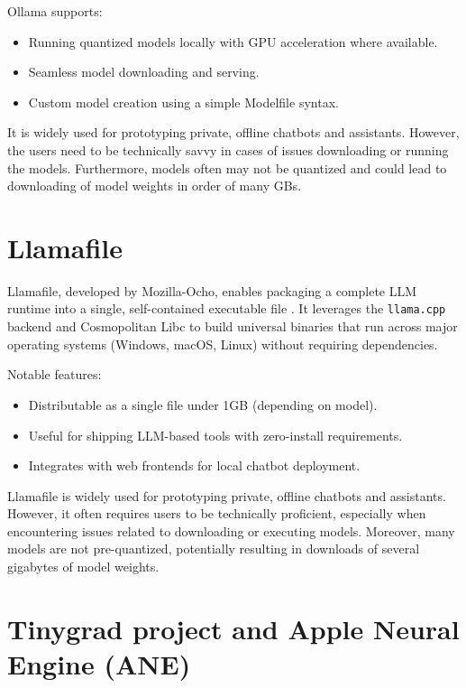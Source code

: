 Ollama supports:
\begin{itemize}
    \item Running quantized models locally with GPU acceleration where available.
    \item Seamless model downloading and serving.
    \item Custom model creation using a simple Modelfile syntax.
\end{itemize}

It is widely used for prototyping private, offline chatbots and assistants. However, the users need to be technically savvy in cases of issues downloading or running the models. Furthermore, models often may not be quantized and could lead to downloading of model weights in order of many GBs.


\section{Llamafile}
\label{sec:llamafile}


Llamafile, developed by Mozilla-Ocho, enables packaging a complete LLM runtime into a single, self-contained executable file \cite{llamafile}. It leverages the \texttt{llama.cpp} backend and Cosmopolitan Libc to build universal binaries that run across major operating systems (Windows, macOS, Linux) without requiring dependencies.

Notable features:
\begin{itemize}
    \item Distributable as a single file under 1GB (depending on model).
    \item Useful for shipping LLM-based tools with zero-install requirements.
    \item Integrates with web frontends for local chatbot deployment.
\end{itemize}

Llamafile is widely used for prototyping private, offline chatbots and assistants. However, it often requires users to be technically proficient, especially when encountering issues related to downloading or executing models. Moreover, many models are not pre-quantized, potentially resulting in downloads of several gigabytes of model weights.
\section{Tinygrad project and Apple Neural Engine (ANE)}
\label{sec:ANEAPI}

